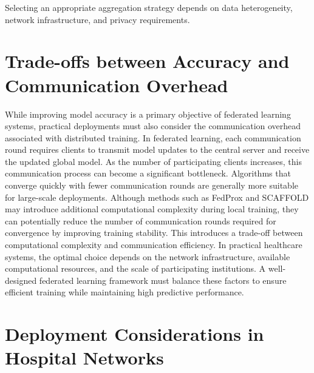 \documentclass[12pt]{book}
\begin{document}
Selecting an appropriate aggregation strategy depends on data heterogeneity, network infrastructure, and privacy requirements.

\section{Trade-offs between Accuracy and Communication Overhead}

While improving model accuracy is a primary objective of federated learning systems, practical deployments must also consider the communication overhead associated with distributed training. In federated learning, each communication round requires clients to transmit model updates to the central server and receive the updated global model. As the number of participating clients increases, this communication process can become a significant bottleneck.
Algorithms that converge quickly with fewer communication rounds are generally more suitable for large-scale deployments. Although methods such as FedProx and SCAFFOLD may introduce additional computational complexity during local training, they can potentially reduce the number of communication rounds required for convergence by improving training stability.
This introduces a trade-off between computational complexity and communication efficiency. In practical healthcare systems, the optimal choice depends on the network infrastructure, available computational resources, and the scale of participating institutions. A well-designed federated learning framework must balance these factors to ensure efficient training while maintaining high predictive performance.

\section{Deployment Considerations in Hospital Networks}
\end{document}

